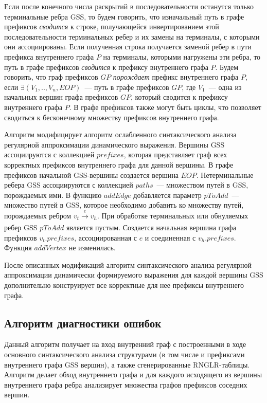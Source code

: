 Если после конечного числа раскрытий в последовательности останутся только терминальные ребра GSS, то будем говорить, что изначальный путь в графе префиксов \emph{сводится} к строке, получающейся инвертированием этой последовательности терминальных ребер и их замены на терминалы, с которыми они ассоциированы. Если полученная строка получается заменой ребер в пути префикса внутреннего графа $P$ на терминалы, которыми нагружены эти ребра, то путь в графе префиксов \emph{сводится} к префиксу внутреннего графа $P$. Будем говорить, что граф префиксов $GP$ \emph{порождает} префикс внутреннего графа $P$, если $\exists (V_{1},..,V_{n},EOP)$~--- путь в графе префиксов $GP$, где $V_{1}$~--- одна из начальных вершин графа префиксов $GP$, который сводится к префиксу внутреннего графа $P$. В графе префиксов также могут быть циклы, что позволяет сводиться к бесконечному множеству префиксов внутреннего графа.


Алгоритм модифицирует алгоритм ослабленного синтаксического анализа регулярной аппроксимации динамического выражения. Вершины GSS ассоциируются с коллекцией $prefixes$, которая представляет граф всех корректных префиксов внутреннего графа для данной вершины. В графе префиксов начальной GSS-вершины создается вершина $EOP$. Нетерминальные ребера GSS ассоциируются с коллекцией $paths$~--- множеством путей в GSS, порождаемых ими. В функцию $addEdge$ добавляется параметр $pToAdd$~--- множество путей в GSS, которое необходимо добавить ко множеству путей, порождаемых ребром $v_{t} \xrightarrow[]{e} v_{h}$. При обработке терминальных или обнуляемых ребер GSS $pToAdd$ является пустым. Создается начальная вершина графа префиксов $v_{t}.prefixes$, ассоциированная с $e$ и соединенная с $v_{h}.prefixes$. Функция $addVertex$ не изменилась.

После описанных модификаций алгоритм синтаксического анализа регулярной аппроксимации динамически формируемого выражения для каждой вершины GSS дополнительно конструирует все корректные для нее префиксы внутреннего графа.


\subsection{Алгоритм диагностики ошибок}
Данный алгоритм получает на вход внутренний граф с построенными в ходе основного синтаксического анализа структурами (в том числе и префиксами внутреннего графа GSS вершин), а также сгенерированные RNGLR-таблицы. Алгоритм делает обход внутреннего графа и для каждого исходящего из вершины внутреннего графа ребра анализирует множества графов префиксов соседних вершин. 

